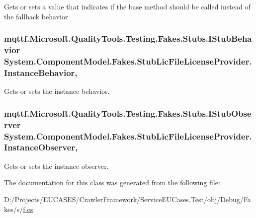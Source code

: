 Gets or sets a value that indicates if the base method should be called instead of the fallback behavior

\hypertarget{class_system_1_1_component_model_1_1_fakes_1_1_stub_lic_file_license_provider_a9b60509eeb598db8001501a89b92f6e9}{
\subsubsection[{Instance\-Behavior}]{\setlength{\rightskip}{0pt plus 5cm}mqttf.\-Microsoft.\-Quality\-Tools.\-Testing.\-Fakes.\-Stubs.\-I\-Stub\-Behavior System.\-Component\-Model.\-Fakes.\-Stub\-Lic\-File\-License\-Provider.\-Instance\-Behavior\hspace{0.3cm}{\ttfamily [get]}, {\ttfamily [set]}}}\label{class_system_1_1_component_model_1_1_fakes_1_1_stub_lic_file_license_provider_a9b60509eeb598db8001501a89b92f6e9}


Gets or sets the instance behavior.

\hypertarget{class_system_1_1_component_model_1_1_fakes_1_1_stub_lic_file_license_provider_a00d038a88d85848890b2430ea8b34d13}{
\subsubsection[{Instance\-Observer}]{\setlength{\rightskip}{0pt plus 5cm}mqttf.\-Microsoft.\-Quality\-Tools.\-Testing.\-Fakes.\-Stubs.\-I\-Stub\-Observer System.\-Component\-Model.\-Fakes.\-Stub\-Lic\-File\-License\-Provider.\-Instance\-Observer\hspace{0.3cm}{\ttfamily [get]}, {\ttfamily [set]}}}\label{class_system_1_1_component_model_1_1_fakes_1_1_stub_lic_file_license_provider_a00d038a88d85848890b2430ea8b34d13}


Gets or sets the instance observer.



The documentation for this class was generated from the following file\-:\begin{DoxyCompactItemize}
\item 
D\-:/\-Projects/\-E\-U\-C\-A\-S\-E\-S/\-Crawler\-Framework/\-Service\-E\-U\-Cases.\-Test/obj/\-Debug/\-Fakes/s/\hyperlink{s_2f_8cs}{f.\-cs}\end{DoxyCompactItemize}
